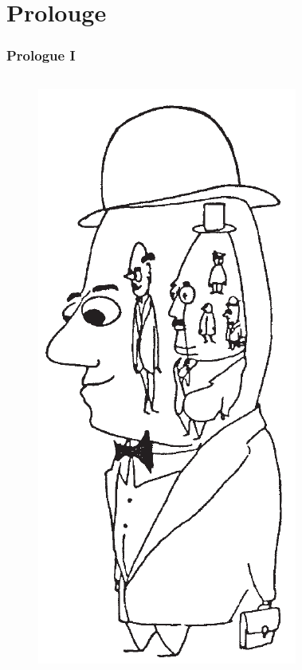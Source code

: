 \documentclass[
	11pt,
	aspectratio=169,
]{beamer}
\begin{document}
    \section*{Prolouge}
        \begin{frame}
        	\frametitle{Prologue I}
        	\begin{columns}
        			\begin{figure}
        				\includegraphics[height=0.7\textheight]{resources/man.png}
        			\end{figure}
        			\begin{figure}

\end{figure}
\end{columns}
\end{frame}
\end{document}
